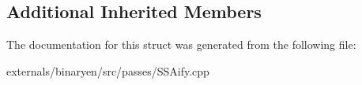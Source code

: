 \subsection*{Additional Inherited Members}


The documentation for this struct was generated from the following file\+:\begin{DoxyCompactItemize}
\item 
externals/binaryen/src/passes/S\+S\+Aify.\+cpp\end{DoxyCompactItemize}
